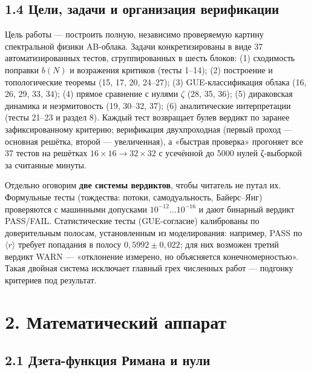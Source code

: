 \documentclass[
]{article}
\begin{document}
\subsection{1.4 Цели, задачи и организация
верификации}\label{ux446ux435ux43bux438-ux437ux430ux434ux430ux447ux438-ux438-ux43eux440ux433ux430ux43dux438ux437ux430ux446ux438ux44f-ux432ux435ux440ux438ux444ux438ux43aux430ux446ux438ux438}

Цель работы --- построить полную, независимо проверяемую картину
спектральной физики AB-облака. Задачи конкретизированы в виде 37
автоматизированных тестов, сгруппированных в шесть блоков: (1)
сходимость поправки \(b(N)\) и возражения критиков (тесты 1--14); (2)
построение и топологические теоремы (15, 17, 20, 24--27); (3)
GUE-классификация облака (16, 26, 29, 33, 34); (4) прямое сравнение с
нулями \(\zeta\) (28, 35, 36); (5) дираковская динамика и неэрмитовость
(19, 30--32, 37); (6) аналитические интерпретации (тесты 21--23 и раздел
8). Каждый тест возвращает булев вердикт по заранее зафиксированному
критерию; верификация двухпроходная (первый проход --- основная решётка,
второй --- увеличенная), а «быстрая проверка» прогоняет все 37 тестов на
решётках \(16\times16\to32\times32\) с усечённой до 5000 нулей
ζ-выборкой за считанные минуты.

Отдельно оговорим \textbf{две системы вердиктов}, чтобы читатель не
путал их. Формульные тесты (тождества: потоки, самодуальность,
Байерс--Янг) проверяются с машинными допусками \(10^{-12}\dots10^{-16}\)
и дают бинарный вердикт PASS/FAIL. Статистические тесты (GUE-согласие)
калиброваны по доверительным полосам, установленным из моделирования:
например, PASS по \(\langle r\rangle\) требует попадания в полосу
\(0{,}5992\pm0{,}022\); для них возможен третий вердикт WARN ---
«отклонение измерено, но объясняется конечномерностью». Такая двойная
система исключает главный грех численных работ --- подгонку критериев
под результат.

\section{2. Математический
аппарат}\label{ux43cux430ux442ux435ux43cux430ux442ux438ux447ux435ux441ux43aux438ux439-ux430ux43fux43fux430ux440ux430ux442}

\subsection{2.1 Дзета-функция Римана и
нули}\label{ux434ux437ux435ux442ux430-ux444ux443ux43dux43aux446ux438ux44f-ux440ux438ux43cux430ux43dux430-ux438-ux43dux443ux43bux438}
\end{document}
